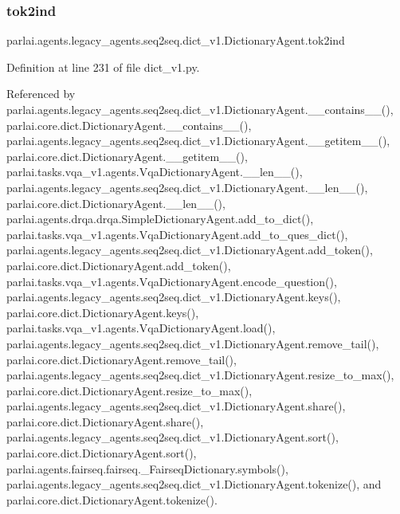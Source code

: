 \subsubsection{\texorpdfstring{tok2ind}{tok2ind}}
{\footnotesize\ttfamily parlai.\+agents.\+legacy\+\_\+agents.\+seq2seq.\+dict\+\_\+v1.\+Dictionary\+Agent.\+tok2ind}



Definition at line 231 of file dict\+\_\+v1.\+py.



Referenced by parlai.\+agents.\+legacy\+\_\+agents.\+seq2seq.\+dict\+\_\+v1.\+Dictionary\+Agent.\+\_\+\+\_\+contains\+\_\+\+\_\+(), parlai.\+core.\+dict.\+Dictionary\+Agent.\+\_\+\+\_\+contains\+\_\+\+\_\+(), parlai.\+agents.\+legacy\+\_\+agents.\+seq2seq.\+dict\+\_\+v1.\+Dictionary\+Agent.\+\_\+\+\_\+getitem\+\_\+\+\_\+(), parlai.\+core.\+dict.\+Dictionary\+Agent.\+\_\+\+\_\+getitem\+\_\+\+\_\+(), parlai.\+tasks.\+vqa\+\_\+v1.\+agents.\+Vqa\+Dictionary\+Agent.\+\_\+\+\_\+len\+\_\+\+\_\+(), parlai.\+agents.\+legacy\+\_\+agents.\+seq2seq.\+dict\+\_\+v1.\+Dictionary\+Agent.\+\_\+\+\_\+len\+\_\+\+\_\+(), parlai.\+core.\+dict.\+Dictionary\+Agent.\+\_\+\+\_\+len\+\_\+\+\_\+(), parlai.\+agents.\+drqa.\+drqa.\+Simple\+Dictionary\+Agent.\+add\+\_\+to\+\_\+dict(), parlai.\+tasks.\+vqa\+\_\+v1.\+agents.\+Vqa\+Dictionary\+Agent.\+add\+\_\+to\+\_\+ques\+\_\+dict(), parlai.\+agents.\+legacy\+\_\+agents.\+seq2seq.\+dict\+\_\+v1.\+Dictionary\+Agent.\+add\+\_\+token(), parlai.\+core.\+dict.\+Dictionary\+Agent.\+add\+\_\+token(), parlai.\+tasks.\+vqa\+\_\+v1.\+agents.\+Vqa\+Dictionary\+Agent.\+encode\+\_\+question(), parlai.\+agents.\+legacy\+\_\+agents.\+seq2seq.\+dict\+\_\+v1.\+Dictionary\+Agent.\+keys(), parlai.\+core.\+dict.\+Dictionary\+Agent.\+keys(), parlai.\+tasks.\+vqa\+\_\+v1.\+agents.\+Vqa\+Dictionary\+Agent.\+load(), parlai.\+agents.\+legacy\+\_\+agents.\+seq2seq.\+dict\+\_\+v1.\+Dictionary\+Agent.\+remove\+\_\+tail(), parlai.\+core.\+dict.\+Dictionary\+Agent.\+remove\+\_\+tail(), parlai.\+agents.\+legacy\+\_\+agents.\+seq2seq.\+dict\+\_\+v1.\+Dictionary\+Agent.\+resize\+\_\+to\+\_\+max(), parlai.\+core.\+dict.\+Dictionary\+Agent.\+resize\+\_\+to\+\_\+max(), parlai.\+agents.\+legacy\+\_\+agents.\+seq2seq.\+dict\+\_\+v1.\+Dictionary\+Agent.\+share(), parlai.\+core.\+dict.\+Dictionary\+Agent.\+share(), parlai.\+agents.\+legacy\+\_\+agents.\+seq2seq.\+dict\+\_\+v1.\+Dictionary\+Agent.\+sort(), parlai.\+core.\+dict.\+Dictionary\+Agent.\+sort(), parlai.\+agents.\+fairseq.\+fairseq.\+\_\+\+Fairseq\+Dictionary.\+symbols(), parlai.\+agents.\+legacy\+\_\+agents.\+seq2seq.\+dict\+\_\+v1.\+Dictionary\+Agent.\+tokenize(), and parlai.\+core.\+dict.\+Dictionary\+Agent.\+tokenize().

